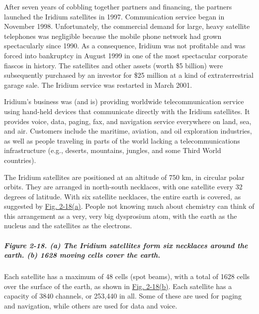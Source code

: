 \documentclass[b5paper,11pt]{memoir}
\begin{document}
After seven years of cobbling together partners and financing, the
partners launched the Iridium satellites in 1997. Communication service
began in November 1998. Unfortunately, the commercial demand for large,
heavy satellite telephones was negligible because the mobile phone
network had grown spectacularly since 1990. As a consequence, Iridium
was not profitable and was forced into bankruptcy in August 1999 in one
of the most spectacular corporate fiascos in history. The satellites and
other assets (worth \$5 billion) were subsequently purchased by an
investor for \$25 million at a kind of extraterrestrial garage sale. The
Iridium service was restarted in March 2001.

Iridium's business was (and is) providing worldwide telecommunication
service using hand-held devices that communicate directly with the
Iridium satellites. It provides voice, data, paging, fax, and navigation
service everywhere on land, sea, and air. Customers include the
maritime, aviation, and oil exploration industries, as well as people
traveling in parts of the world lacking a telecommunications
infrastructure (e.g., deserts, mountains, jungles, and some Third World
countries).

The Iridium satellites are positioned at an altitude of 750 km, in
circular polar orbits. They are arranged in north-south necklaces, with
one satellite every 32 degrees of latitude. With six satellite
necklaces, the entire earth is covered, as suggested by
\protect\hyperlink{0130661023_ch02lev1sec4.htmlux5cux23ch02fig18}{Fig.
2-18(a)}. People not knowing much about chemistry can think of this
arrangement as a very, very big dysprosium atom, with the earth as the
nucleus and the satellites as the electrons.

\subparagraph[Figure 2-18. (a) The Iridium satellites form six necklaces
around the earth. (b) 1628 moving cells cover the
earth.]{\texorpdfstring{\protect\hypertarget{0130661023_ch02lev1sec4.htmlux5cux23ch02fig18}{}{}Figure
2-18. (a) The Iridium satellites form six necklaces around the earth.
(b) 1628 moving cells cover the
earth.}{Figure 2-18. (a) The Iridium satellites form six necklaces around the earth. (b) 1628 moving cells cover the earth.}}


Each satellite has a maximum of 48 cells (spot beams), with a total of
1628 cells over the surface of the earth, as shown in
\protect\hyperlink{0130661023_ch02lev1sec4.htmlux5cux23ch02fig18}{Fig.
2-18(b)}. Each satellite has a capacity of 3840 channels, or 253,440 in
all. Some of these are used for paging and navigation, while others are
used for data and voice.
\end{document}
